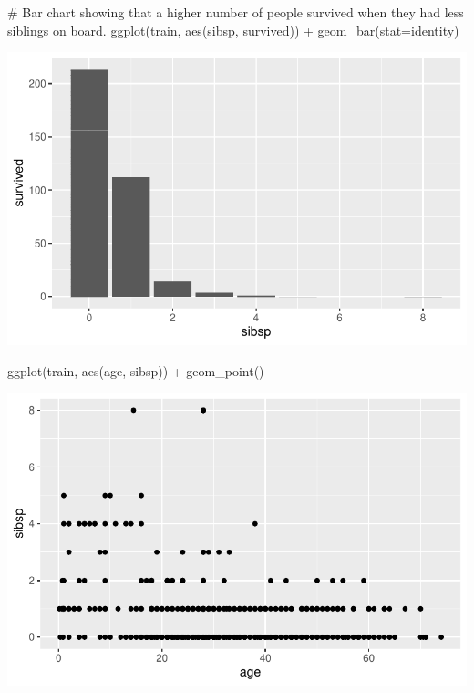 \documentclass[
  letterpaper,
  DIV=11,
  numbers=noendperiod]{scrartcl}
\newenvironment{Shaded}{\begin{snugshade}}{\end{snugshade}}
\newcommand{\AttributeTok}[1]{\textcolor[rgb]{0.40,0.45,0.13}{#1}}
\newcommand{\CommentTok}[1]{\textcolor[rgb]{0.37,0.37,0.37}{#1}}
\newcommand{\FunctionTok}[1]{\textcolor[rgb]{0.28,0.35,0.67}{#1}}
\newcommand{\NormalTok}[1]{\textcolor[rgb]{0.00,0.23,0.31}{#1}}
\newcommand{\SpecialCharTok}[1]{\textcolor[rgb]{0.37,0.37,0.37}{#1}}
\newcommand{\StringTok}[1]{\textcolor[rgb]{0.13,0.47,0.30}{#1}}
\begin{document}
\begin{Shaded}
\begin{Highlighting}[]
\CommentTok{\# Bar chart showing that a higher number of people survived when they had less siblings on board.}
\FunctionTok{ggplot}\NormalTok{(train, }\FunctionTok{aes}\NormalTok{(sibsp, survived)) }\SpecialCharTok{+}
  \FunctionTok{geom\_bar}\NormalTok{(}\AttributeTok{stat=}\StringTok{\textquotesingle{}identity\textquotesingle{}}\NormalTok{)}
\end{Highlighting}
\end{Shaded}

\includegraphics{FinalProject_files/figure-pdf/unnamed-chunk-10-3.pdf}

\begin{Shaded}
\begin{Highlighting}[]
\FunctionTok{ggplot}\NormalTok{(train, }\FunctionTok{aes}\NormalTok{(age, sibsp)) }\SpecialCharTok{+}
  \FunctionTok{geom\_point}\NormalTok{()}
\end{Highlighting}
\end{Shaded}

\includegraphics{FinalProject_files/figure-pdf/unnamed-chunk-10-4.pdf}
\end{document}
